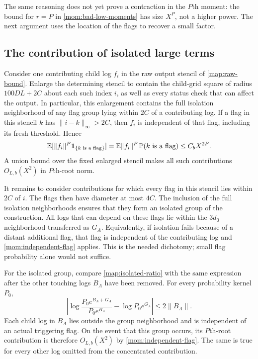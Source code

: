 The same reasoning does not yet prove a contraction in the $P$th
moment: the bound for $r=P$ in \eqref{mom:bad-low-moments} has size
$X^P$, not a higher power.  The next argument uses the location of the
flags to recover a small factor.

\subsection{The contribution of isolated large terms}

Consider one contributing child log $f_i$ in the raw output stencil
of \eqref{map:raw-bound}.  Enlarge the determining stencil to contain
the child-grid square of radius $100DL+2C$ about each such index $i$,
as well as every status check that can affect the output.  In particular,
this enlargement contains the full isolation neighborhood of any flag
group lying within $2C$ of a contributing log.  If a flag in this stencil
$k$ has $\|i-k\|_\infty>2C$, then $f_i$ is independent of that flag,
including its fresh threshold.  Hence
\begin{equation}\label{mom:independent-flag}
 \mathbb E[\|f_i\|^P\mathbf 1_{\{k\text{ is a flag}\}}]
 =\mathbb E\|f_i\|^P\,\mathbb P(k\text{ is a flag})
 \le C_bX^{2P}.
\end{equation}
A union bound over the fixed enlarged stencil makes all such
contributions $O_{L,b}(X^2)$ in $P$th-root norm.

It remains to consider contributions for which every flag in this stencil
lies within $2C$ of $i$.  The flags then have diameter at most $4C$.
The inclusion of the full isolation neighborhoods ensures that they
form an isolated group of the construction.  All logs that can depend
on these flags lie within the $3d_0$ neighborhood transferred as $G_A$.
Equivalently, if isolation fails because of a distant additional flag,
that flag is independent of the contributing log and
\eqref{mom:independent-flag} applies.  This is the needed dichotomy;
small flag probability alone would not suffice.

For the isolated group, compare \eqref{map:isolated-ratio} with the
same expression after the other touching logs $B_A$ have been removed.
For every probability kernel $P_0$,
\begin{equation}\label{mom:remove-background}
 \left|\log\frac{P_0e^{B_A+G_A}}{P_0e^{B_A}}
                  -\log P_0e^{G_A}\right|
 \le2\|B_A\|.
\end{equation}
Each child log in $B_A$ lies outside the group neighborhood and is
independent of an actual triggering flag.  On the event that this group
occurs, its $P$th-root contribution is therefore $O_{L,b}(X^2)$ by
\eqref{mom:independent-flag}.  The same is true for every other log
omitted from the concentrated contribution.


